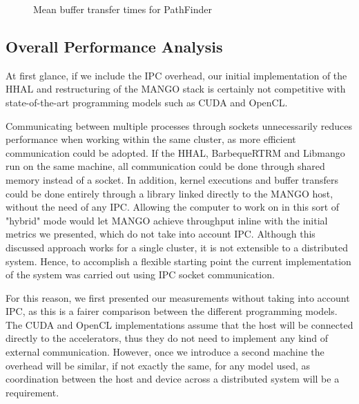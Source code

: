 \begin{figure}%
    \centering
    \qquad
    \captionsetup{justification=centering}
    \caption{Mean buffer transfer times for PathFinder}%
    \label{fig:pathfinder_buffer_transfers_mean_ipc}%
\end{figure}

\subsection{Overall Performance Analysis}

At first glance, if we include the IPC overhead, our initial implementation of the HHAL and restructuring of the MANGO stack is certainly not competitive with state-of-the-art programming models such as CUDA and OpenCL. 

Communicating between multiple processes through sockets unnecessarily reduces performance when working within the same cluster, as more efficient communication could be adopted. If the HHAL, BarbequeRTRM and Libmango run on the same machine, all communication could be done through shared memory instead of a socket. In addition, kernel executions and buffer transfers could be done entirely through a library linked directly to the MANGO host, without the need of any IPC. Allowing the computer to work on in this sort of "hybrid" mode would let MANGO achieve throughput inline with the initial metrics we presented, which do not take into account IPC. Although this discussed approach works for a single cluster, it is not extensible to a distributed system. Hence, to accomplish a flexible starting point the current implementation of the system was carried out using IPC socket communication.

For this reason, we first presented our measurements without taking into account IPC, as this is a fairer comparison between the different programming models. The CUDA and OpenCL implementations assume that the host will be connected directly to the accelerators, thus they do not need to implement any kind of external communication. However, once we introduce a second machine the overhead will be similar, if not exactly the same, for any model used, as coordination between the host and device across a distributed system will be a requirement.

